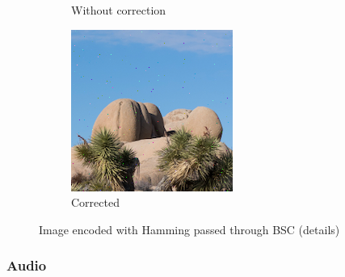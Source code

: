 \documentclass{article}
\begin{document}
\begin{figure}
\begin{subfigure}[b]{0.32\textwidth}
        \caption{Without correction}
        \label{fig:cropped-image-hamming-bsc-no-correction}
    \end{subfigure}
    \hfill
    \begin{subfigure}[b]{0.32\textwidth}
        \centering
        \includegraphics[width=\textwidth]{../Result/cropped-hamming-bsc-output-corrected.png}
        \caption{Corrected}
        \label{fig:cropped-image-hamming-bsc-corrected}
    \end{subfigure}
       \caption{Image encoded with Hamming passed through BSC (details)}
       \label{fig:cropped-image-hamming-bsc}
\end{figure}


\subsubsection{Audio}
\end{document}

